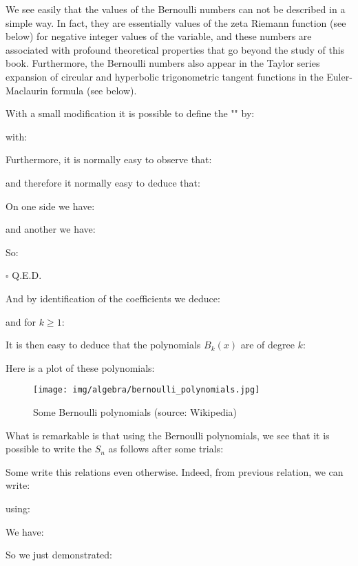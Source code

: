 	We see easily that the values of the Bernoulli numbers can not be described in a simple way. In fact, they are essentially values of the zeta Riemann function (see below) for negative integer values of the variable, and these numbers are associated with profound theoretical properties that go beyond the study of this book. Furthermore, the Bernoulli numbers also appear in the Taylor series expansion of  circular and hyperbolic trigonometric tangent functions in the Euler-Maclaurin formula (see below).
	
	With a small modification it is possible to define the "\label{bernoulli polynomials}" by:
	
	with:
	
	\begin{theorem}
	Furthermore, it is normally easy to observe that:
	
	and therefore it normally easy to deduce that:
	
	\end{theorem}
	\begin{dem}
	On one side we have:
	
	and another we have:
	
	So:
	
	\begin{flushright}
		$\square$  Q.E.D.
	\end{flushright}
	\end{dem}
	And by identification of the coefficients we deduce:
	
	and for $k \geq 1$:
	
	It is then easy to deduce that the polynomials $B_k(x)$ are of degree $k$:
	
	Here is a plot of these polynomials:
	\begin{figure}[H]
		\centering
		\texttt{[image: img/algebra/bernoulli\_polynomials.jpg]}
		\caption[Some Bernoulli polynomials]{Some Bernoulli polynomials (source: Wikipedia)}
	\end{figure}
	What is remarkable is that using the Bernoulli polynomials, we see that it is possible to write the $S_n$ as follows after some trials:
	
	
	Some write this relations even otherwise. Indeed, from previous relation, we can write:
	
	using:
	
	We have:
	
	So we just demonstrated:
	
	
	

